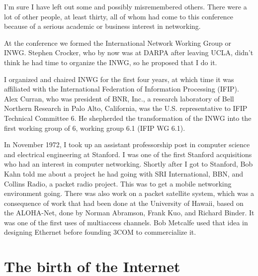 \documentclass[10pt,a4paper]{scrartcl}
\begin{document}
I'm sure I have left out some and possibly misremembered others. There were a lot of other people, at least thirty, all of whom had come to this conference because of a serious academic or business interest in networking.

At the conference we formed the International Network Working Group or INWG. Stephen Crocker, who by now was at DARPA after leaving UCLA, didn't think he had time to organize the INWG, so he proposed that I do it.

I organized and chaired INWG for the first four years, at which time it was affiliated with the International Federation of Information Processing (IFIP). Alex Curran, who was president of BNR, Inc., a research laboratory of Bell Northern Research in Palo Alto, California, was the U.S. representative to IFIP Technical Committee 6. He shepherded the transformation of the INWG into the first working group of 6, working group 6.1 (IFIP WG 6.1).

In November 1972, I took up an assistant professorship post in computer science and electrical engineering at Stanford. I was one of the first Stanford acquisitions who had an interest in computer networking. Shortly after I got to Stanford, Bob Kahn told me about a project he had going with SRI International, BBN, and Collins Radio, a packet radio project. This was to get a mobile networking environment going. There was also work on a packet satellite system, which was a consequence of work that had been done at the University of Hawaii, based on the ALOHA-Net, done by Norman Abramson, Frank Kuo, and Richard Binder. It was one of the first uses of multiaccess channels. Bob Metcalfe used that idea in designing Ethernet before founding 3COM to commercialize it.


{\section {The birth of the Internet}}
\end{document}
